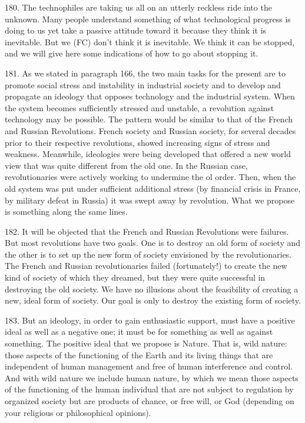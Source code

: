 \documentclass{article}
\begin{document}
\hspace{0.5cm} 180.  The technophiles are taking us all on an utterly reckless ride into the unknown.  Many people 
understand  something  of  what  technological  progress  is  doing  to  us  yet  take  a  passive  attitude  
toward it because they think it is inevitable.  But we (FC) don’t think it is inevitable.  We think it 
can be stopped, and we will give here some indications of how to go about stopping it. \vspace{\baselineskip}

181.  As we stated in paragraph 166, the two main tasks for the present are to promote social stress 
and  instability  in  industrial  society  and  to  develop  and  propagate  an  ideology  that  opposes  
technology  and  the  industrial  system.   When  the  system  becomes  sufficiently  stressed  and  
unstable, a revolution against technology may be possible.  The pattern would be similar to that of 
the French and Russian Revolutions.  French society and Russian society, for several decades prior 
to  their  respective  revolutions,  showed  increasing  signs  of  stress  and  weakness.   Meanwhile, 
ideologies were being developed that offered a new world view that was quite different from the 
old  one.   In  the  Russian  case,  revolutionaries  were  actively  working  to  undermine  the  ol
order.  Then, when the old system was put under sufficient additional stress (by financial crisis in 
France,  by  military  defeat  in  Russia)  it  was  swept  away  by  revolution.   What  we  propose  is  
something along the same lines. \vspace{\baselineskip} \newpage

182.  It  will  be  objected  that  the  French  and  Russian  Revolutions  were  failures.   But  most  
revolutions have two goals.  One is to destroy an old form of society and the other is to set up the 
new form of society envisioned by the revolutionaries.  The French and Russian revolutionaries 
failed (fortunately!) to create the new kind of society of which they dreamed, but they were quite 
successful in destroying the old society.  We have no illusions about the feasibility of creating a 
new, ideal form of society.  Our goal is only to destroy the existing form of society. \vspace{\baselineskip}

183.  But an ideology, in order to gain enthusiastic support, must have a positive ideal as well as a 
negative one; it must be for something as well as against something.  The positive ideal that we 
propose is Nature.  That is, wild nature: those aspects of the functioning of the Earth and its living 
things that are independent of human management and free of human interference and 
control.  And with wild nature we include human nature, by which we mean those aspects of the 
functioning of the human individual that are not subject to regulation by organized society but are 
products of chance, or free will, or God (depending on your religious or philosophical opinions). \vspace{\baselineskip}
\end{document}
